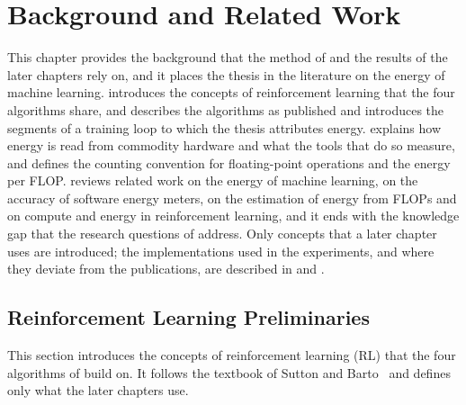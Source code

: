 \chapter{Background and Related Work}\label{ch:background}

This chapter provides the background that the method of  and the results of the later chapters rely on, and it places the thesis in the literature on the energy of machine learning.
 introduces the concepts of reinforcement learning that the four algorithms share, and  describes the algorithms as published and introduces the segments of a training loop to which the thesis attributes energy.
 explains how energy is read from commodity hardware and what the tools that do so measure, and  defines the counting convention for floating-point operations and the energy per FLOP.
 reviews related work on the energy of machine learning, on the accuracy of software energy meters, on the estimation of energy from FLOPs and on compute and energy in reinforcement learning, and it ends with the knowledge gap that the research questions of  address.
Only concepts that a later chapter uses are introduced; the implementations used in the experiments, and where they deviate from the publications, are described in  and .


\section{Reinforcement Learning Preliminaries}\label{sec:rl-prelim}

This section introduces the concepts of reinforcement learning (RL) that the four algorithms of  build on.
It follows the textbook of Sutton and Barto~\cite{sutton2018rl} and defines only what the later chapters use.

